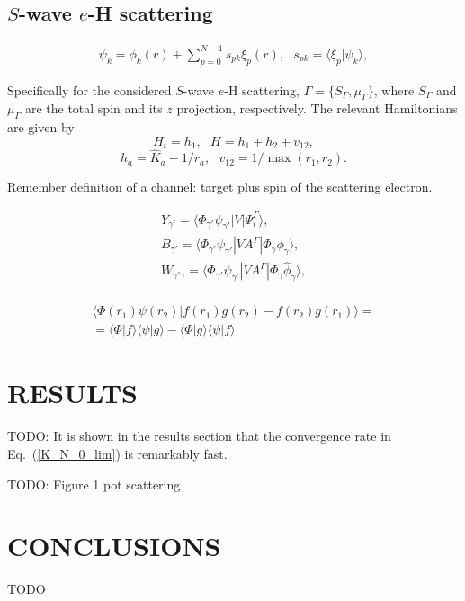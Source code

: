 \documentclass[aip
, pra
, showpacs
, aps
, twocolumn
, groupedaddress
, floatfix
]{revtex4}
\newcommand{\beq}{\begin{equation}}
\newcommand{\eeq}{\end{equation}}
\newcommand{\barr}{\begin{array}}
\newcommand{\earr}{\end{array}}
\begin{document}
\subsection{$S$-wave $e$-H scattering}

\beq \barr{l}
\psi_k = \phi_k(r) +  \sum_{p=0}^{N-1} s_{pk} \xi_p(r), \ \ \ s_{pk} = \langle \xi_p | \psi_k \rangle,
\earr \label{Psi_} \eeq


Specifically for the considered $S$-wave $e$-H scattering,
$\Gamma=\{S_\Gamma,\mu_\Gamma\}$, where $S_\Gamma$ and $\mu_\Gamma$ are the total spin and its $z$ projection, respectively.
The relevant Hamiltonians are given by
\beq
H_t = h_1, \ \ \ H = h_1 + h_2 + v_{12},
\label{H_t} \eeq
\beq
h_a = \hat{K}_a  - 1/r_a,\ \ \ v_{12} = 1/\max{(r_{1}, r_{2})}.
\label{h_b} \eeq


Remember definition of a channel: target plus spin of the scattering electron.


\beq \barr{l}
Y_{\gamma'} = \langle \Phi_{\gamma'}  \psi_{\gamma'} |V|\Psi_i^{\Gamma} \rangle,\\
B_{\gamma'} = \langle  \Phi_{\gamma'}  \psi_{\gamma'} |VA^{\Gamma} |\Phi_{\gamma} \phi_{\gamma} \rangle,\\
W_{\gamma' \gamma} = \langle \Phi_{\gamma'}  \psi_{\gamma'} |V A^{\Gamma} |\Phi_{\gamma} \widehat{\phi}_{\gamma} \rangle,\\
\earr \label{Psi_} \eeq

\beq \barr{l}
\langle  \Phi(r_1) \psi(r_2) |f(r_1) g(r_2) - f(r_2) g(r_1) \rangle = \\
=\langle  \Phi |f \rangle  \langle  \psi |g \rangle -
\langle  \Phi |g \rangle  \langle  \psi |f \rangle
\earr \eeq


\section{RESULTS}
TODO: It is shown in the results section that the convergence rate in Eq.~(\ref{K_N_0_lim}) is remarkably fast.

TODO: Figure 1 pot scattering

\section{CONCLUSIONS}
TODO


\begin{acknowledgments}
\end{acknowledgments}





%
\end{document}
